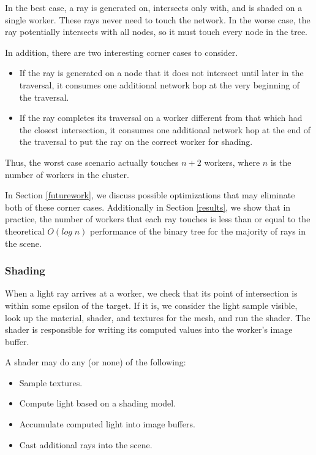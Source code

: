 \documentclass[a4paper,twoside]{article}
\begin{document}
In the best case, a ray is generated on, intersects only with, and is shaded on
a single worker. These rays never need to touch the network. In the worse case,
the ray potentially intersects with all nodes, so it must touch every node in
the tree.

In addition, there are two interesting corner cases to consider.

\begin{itemize}
    \item If the ray is generated on a node that it does not intersect until
        later in the traversal, it consumes one additional network hop at the
        very beginning of the traversal.
    \item If the ray completes its traversal on a worker different from that
        which had the closest intersection, it consumes one additional network
        hop at the end of the traversal to put the ray on the correct worker for
        shading.
\end{itemize}

Thus, the worst case scenario actually touches $n + 2$ workers, where $n$ is the
number of workers in the cluster.

In Section \ref{futurework}, we discuss possible optimizations that may eliminate
both of these corner cases. Additionally in Section \ref{results}, we show that
in practice, the number of workers that each ray touches is less than or equal
to the theoretical $O(log\;n)$ performance of the binary tree for the majority
of rays in the scene.

\subsubsection{Shading}
\label{shading}

When a light ray arrives at a worker, we check that its point of intersection
is within some epsilon of the target. If it is, we consider the light sample
visible, look up the material, shader, and textures for the mesh, and run the
shader. The shader is responsible for writing its computed values into the
worker's image buffer.

A shader may do any (or none) of the following:

\begin{itemize}
    \item Sample textures.
    \item Compute light based on a shading model.
    \item Accumulate computed light into image buffers.
    \item Cast additional rays into the scene.
\end{itemize}
\end{document}
